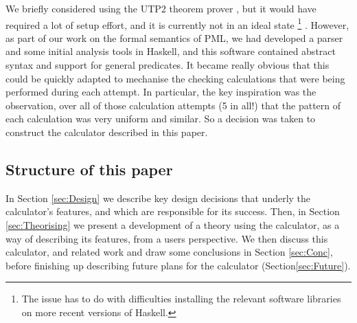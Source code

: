 We briefly considered using the UTP2 theorem prover
\cite{DBLP:conf/utp/Butterfield10,DBLP:conf/utp/Butterfield12},
but it would have required a lot of setup effort,
and it is currently not in an ideal state%
\footnote{The issue has to do with difficulties installing
the relevant software libraries
on more recent versions of Haskell.}
.
However, as part of our work on the formal semantics of PML,
we had developed a parser and some initial analysis tools
in Haskell\cite{Haskell2010},
and this software contained abstract syntax and support
for general predicates.
It became really obvious that this could be quickly adapted
to mechanise the checking calculations that were being performed
during each attempt.
In particular,
the key inspiration was the observation,
over all of those calculation attempts (5 in all!)
that the pattern of each calculation was very uniform and similar.
So a decision was taken to construct the calculator described in this paper.



\subsection{Structure of this paper}

In Section \ref{sec:Design}
we describe key design decisions
that underly the calculator's features,
and which are responsible for its success.
Then, in Section \ref{sec:Theorising}
we present a development of a theory using the calculator,
as a way of describing its features, from a users perspective.
We then discuss this calculator, and related work
and draw some conclusions in Section \ref{sec:Conc},
before finishing up describing future plans for the calculator
(Section\ref{sec:Future}).
